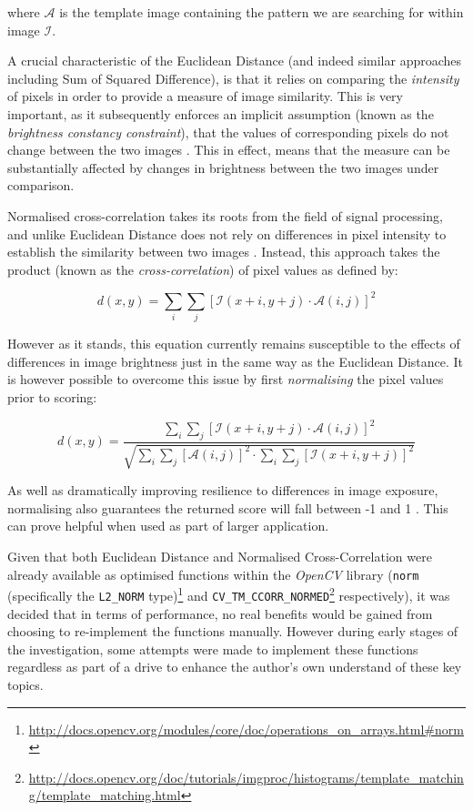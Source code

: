 where $\mathcal{A}$ is the template image containing the pattern we are searching for within image $\mathcal{I}$. 

A crucial characteristic of the Euclidean Distance (and indeed similar approaches including Sum of Squared Difference), is that it relies on comparing the \textit{intensity} of pixels in order to provide a measure of image similarity. This is very important, as it subsequently enforces an implicit assumption (known as the \textit{brightness constancy constraint}), that the values of corresponding pixels do not change between the two images \cite{szeliski}. This in effect, means that the measure can be substantially affected by changes in brightness between the two images under comparison.  

Normalised cross-correlation takes its roots from the field of signal processing, and unlike Euclidean Distance does not rely on differences in pixel intensity to establish the similarity between two images \cite{szeliski}. Instead, this approach takes the product (known as the \textit{cross-correlation}) of pixel values as defined by:

\begin{equation}
d(x, y) = \sum\limits_{i}\sum\limits_{j}[\mathcal{I}(x + i, y + j) \cdot \mathcal{A}(i, j)]^2
\end{equation}

However as it stands, this equation currently remains susceptible to the effects of differences in image brightness just in the same way as the Euclidean Distance. It is however possible to overcome this issue by first \textit{normalising} the pixel values prior to scoring: 

\begin{equation}
d(x, y) = \frac{\sum\limits_{i}\sum\limits_{j}[\mathcal{I}(x + i, y + j) \cdot \mathcal{A}(i, j)]^2}{\sqrt{\sum\limits_{i}\sum\limits_{j}[\mathcal{A}(i, j)]^2 \cdot \sum\limits_{i}\sum\limits_{j}[\mathcal{I}(x + i, y + j)]^2}}
\end{equation}

As well as dramatically improving resilience to differences in image exposure, normalising also guarantees the returned score will fall between -1 and 1 \cite{szeliski}. This can prove helpful when used as part of larger application. 

Given that both Euclidean Distance and Normalised Cross-Correlation were already available as optimised functions within the \textit{OpenCV} library (\texttt{norm} (specifically the \texttt{L2\_NORM} type)\footnote{\url{http://docs.opencv.org/modules/core/doc/operations_on_arrays.html#norm}} and \texttt{CV\_TM\_CCORR\_NORMED}\footnote{\url{http://docs.opencv.org/doc/tutorials/imgproc/histograms/template_matching/template_matching.html}} respectively), it was decided that in terms of performance, no real benefits would be gained from choosing to re-implement the functions manually. However during early stages of the investigation, some attempts were made to implement these functions regardless as part of a drive to enhance the author's own understand of these key topics.

